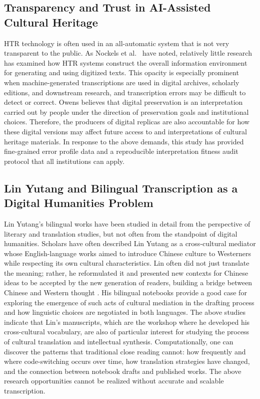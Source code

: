 \documentclass[final]{anthology-ch} %
\begin{document}
\subsection{Transparency and Trust in AI-Assisted Cultural Heritage}

HTR technology is often used in an all-automatic system that is not very transparent to the public. As Nockels et al.\ \cite{nockels2022understanding} have noted, relatively little research has examined how HTR systems construct the overall information environment for generating and using digitized texts. This opacity is especially prominent when machine-generated transcriptions are used in digital archives, scholarly editions, and downstream research, and transcription errors may be difficult to detect or correct. Owens \cite{owens2018theory} believes that digital preservation is an interpretation carried out by people under the direction of preservation goals and institutional choices. Therefore, the producers of digital replicas are also accountable for how these digital versions may affect future access to and interpretations of cultural heritage materials. In response to the above demands, this study has provided fine-grained error profile data and a reproducible interpretation fitness audit protocol that all institutions can apply.

\subsection{Lin Yutang and Bilingual Transcription as a Digital Humanities Problem}

Lin Yutang's bilingual works have been studied in detail from the perspective of literary and translation studies, but not often from the standpoint of digital humanities. Scholars have often described Lin Yutang as a cross-cultural mediator whose English-language works aimed to introduce Chinese culture to Westerners while respecting its own cultural characteristics. Lin often did not just translate the meaning; rather, he reformulated it and presented new contexts for Chinese ideas to be accepted by the new generation of readers, building a bridge between Chinese and Western thought \cite{qian2015cross, qian2011liberal}. His bilingual notebooks provide a good case for exploring the emergence of such acts of cultural mediation in the drafting process and how linguistic choices are negotiated in both languages. The above studies indicate that Lin's manuscripts, which are the workshop where he developed his cross-cultural vocabulary, are also of particular interest for studying the process of cultural translation and intellectual synthesis. Computationally, one can discover the patterns that traditional close reading cannot: how frequently and where code-switching occurs over time, how translation strategies have changed, and the connection between notebook drafts and published works. The above research opportunities cannot be realized without accurate and scalable transcription.
\end{document}
